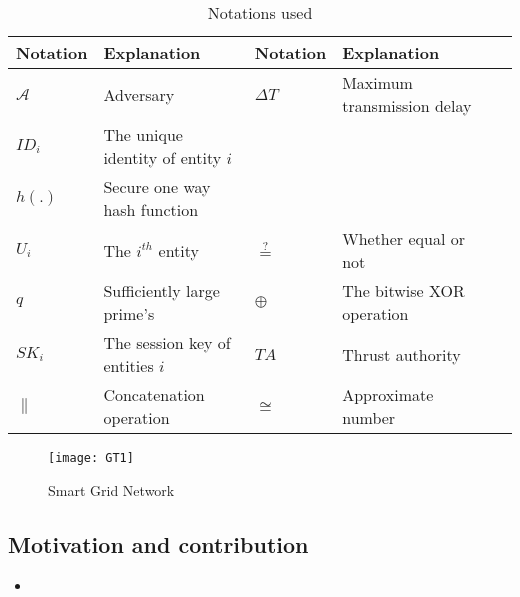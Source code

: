\documentclass[3p,times,onecolumn]{elsarticle}
\begin{document}
\begin{table}[!htp]
\caption{Notations used} \label{nu} %
\centering %
\begin{tabular}{ l l l l l l} %
\hline %
 \textbf{Notation} & \textbf{Explanation} &  \textbf{Notation} & \textbf{Explanation}\\ [0.68ex] %
\hline %
$\mathcal{A}$	              & Adversary                             &$\Delta T$           &Maximum transmission delay \\
$ID_{i}$	                  & The unique identity of entity $i$                                                       \\
$h(.)$                        &Secure one way hash function                                                              \\  $U_{i}$                       & The $i^{th}$ entity                         &$\stackrel{?}{=}$    &Whether equal or not   \\
$q$	                          & Sufficiently large prime's                  &$\oplus$           &The bitwise XOR operation\\
$SK_{i}$	                  & The session key of entities $i$             &$TA$                 &Thrust authority\\
$\|$		                  & Concatenation operation                     & $\cong$               &Approximate number       \\
\hline %
\end{tabular}
\label{table:nonlin} %
\end{table}



\begin{figure}[!htp]
  \centering
  \texttt{[image: GT1]}
  \caption{Smart Grid Network }\label{sd1}
\end{figure}


\subsection{\textbf{ Motivation and contribution} }

\begin{itemize}
\item 


\end{itemize}
\end{document}
